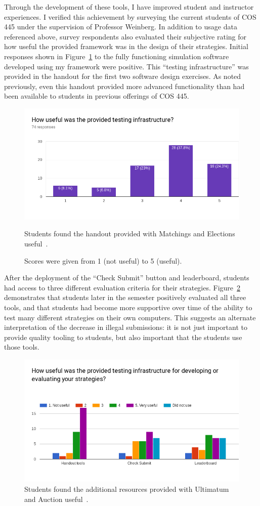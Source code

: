 \documentclass[pageno]{jpaper}
\begin{document}
Through the development of these tools, I have improved student and instructor experiences.
I verified this achievement by surveying the current students of COS 445 under the supervision of Professor Weinberg.
In addition to usage data referenced above, survey respondents also evaluated their subjective rating for how useful the provided framework was in the design of their strategies.
Initial responses shown in Figure~\ref{fig:useful1} to the fully functioning simulation software developed using my framework were positive.
This ``testing infrastructure'' was provided in the handout for the first two software design exercises.
As noted previously, even this handout provided more advanced functionality than had been available to students in previous offerings of COS 445.
\begin{figure}[hbt]
  \centering
  \includegraphics[width=0.75\linewidth]{useful1.png}
  \caption{Students found the handout provided with Matchings and Elections useful~\cite{survey12}.}\label{fig:useful1}
  \caption*{Scores were given from 1 (not useful) to 5 (useful).}
\end{figure}

After the deployment of the ``Check Submit'' button and leaderboard, students had access to three different evaluation criteria for their strategies.
Figure~\ref{fig:useful2} demonstrates that students later in the semester positively evaluated all three tools, and that students had become more supportive over time of the ability to test many different strategies on their own computers.
This suggests an alternate interpretation of the decrease in illegal submissions: it is not just important to provide quality tooling to students, but also important that the students use those tools.
\begin{figure}[hbt]
  \centering
  \includegraphics[width=0.75\linewidth]{useful2.png}
  \caption{Students found the additional resources provided with Ultimatum and Auction useful~\cite{survey34}.}\label{fig:useful2}
\end{figure}
\end{document}
